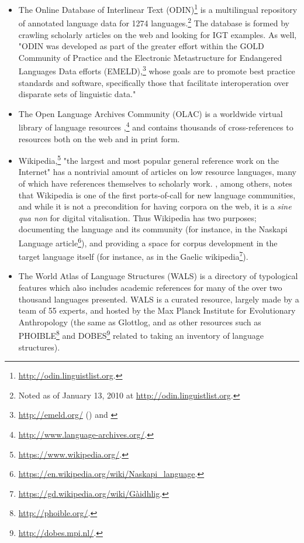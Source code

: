 \begin{itemize}
\item The Online Database of Interlinear Text (ODIN)\footnote{\href{http://odin.linguistlist.org}{http://odin.linguistlist.org}. } is a multilingual repository of annotated language data for 1274 languages.\footnote{Noted as of January 13, 2010 at \href{http://odin.linguistlist.org}{http://odin.linguistlist.org}. } The database is formed by crawling scholarly articles on the web and looking for IGT examples. As well, "ODIN was developed as part of the greater effort within the GOLD Community of Practice \citep{farrar2007gold} and the Electronic Metastructure for Endangered Languages Data efforts (EMELD),\footnote{\href{http://emeld.org/}{http://emeld.org/} () and \citet{farrar2002common}} whose goals are to promote best practice standards and software, specifically those that facilitate interoperation over disparate sets of linguistic data." \citep{lewis2010developing}

\item The Open Language Archives Community (OLAC) is a worldwide virtual library of language resources \citep{simons2003open},\footnote{\href{http://www.language-archives.org/}{http://www.language-archives.org/}. } and contains thousands of cross-references to resources both on the web and in print form.

\item Wikipedia,\footnote{\href{https://www.wikipedia.org/}{https://www.wikipedia.org/}. } "the largest and most popular general reference work on the Internet" \citep{wiki:Wikipedia} has a nontrivial amount of articles on low resource languages, many of which have references themselves to scholarly work. \citet{kornai2013digital}, among others, notes that Wiki\-pedia is one of the first ports-of-call for new language communities, and while it is not a precondition for having corpora on the web, it is a {\it sine qua non} for digital vitalisation. Thus Wikipedia has two purposes; documenting the language and its community (for instance, in the Naskapi Language article\footnote{\href{https://en.wikipedia.org/wiki/Naskapi\_language}{https://en.wikipedia.org/wiki/Naskapi\_language}. }), and providing a space for corpus development in the target language itself (for instance, as in the Gaelic wikipedia\footnote{\href{https://gd.wikipedia.org/wiki/G\%C3\%A0idhlig}{https://gd.wikipedia.org/wiki/G\`aidhlig}. }).

\item The World Atlas of Language Structures (WALS) \citep{wals} is a directory of typological features which also includes academic references for many of the over two thousand languages presented. WALS is a curated resource, largely made by a team of 55 experts, and hosted by the Max Planck Institute for Evolutionary Anthropology (the same as Glottlog, and as other resources such as PHOIBLE\footnote{\href{http://phoible.org/}{http://phoible.org/}. } \citep{phoible} and DOBES\footnote{\href{http://dobes.mpi.nl/}{http://dobes.mpi.nl/}. } \citep{wittenburg2003dobes} related to taking an inventory of language structures).
\end{itemize}

